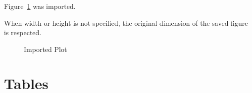 \documentclass[
]{article}
\begin{document}
Figure~\ref{fig-imported-plot} was imported.

When width or height is not specified, the original dimension of the
saved figure is respected.

\begin{figure}


\caption{\label{fig-imported-plot}Imported Plot}

\end{figure}%

\section{Tables}\label{tables}

 
  \providecommand{\huxb}[2]{\arrayrulecolor[RGB]{#1}\global\arrayrulewidth=#2pt}
  \providecommand{\huxvb}[2]{\color[RGB]{#1}\vrule width #2pt}
  \providecommand{\huxtpad}[1]{\rule{0pt}{#1}}
  \providecommand{\huxbpad}[1]{\rule[-#1]{0pt}{#1}}
\end{document}
